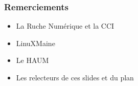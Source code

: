 \documentclass{beamer}
\begin{document}
\begin{frame}
    
    \frametitle{Remerciements}

    \begin{itemize}
        \item La Ruche Numérique et la CCI
        \item LinuXMaine
        \item Le HAUM
        \item Les relecteurs de ces slides et du plan
    \end{itemize}

    \pause{}


\end{frame}
\end{document}
